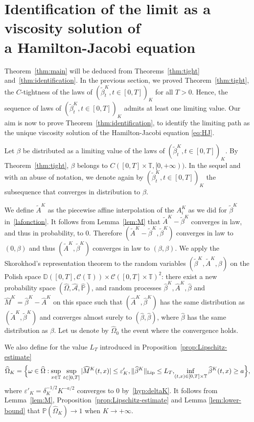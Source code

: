 \documentclass[JEP,XML,SOM,Unicode,published]{cedram}
\let\cal\mathcal
\let\sep:
\theoremstyle{plain}
\theoremstyle{remark}
\newcommand\T{\mathbb{T}}
\renewcommand\P{\mathbb{P}}
\begin{document}
\section{Identification of the limit as a viscosity solution of\\ a Hamilton-Jacobi equation}\label{sec:identif}

Theorem~\ref{thm:main} will be deduced from Theorems~\ref{thm:tight} and~\ref{thm:identification}.
In the previous section, we proved Theorem~\ref{thm:tight}, \ie the $C$-tightness of the laws of $(\widetilde \beta^K_{t}, t\in[0,T])_{K}$ for all $T>0$. Hence, the sequence of laws of $(\widetilde \beta^K_{t}, t\in[0,T])_{K}$ admits at least one limiting value. Our aim is now to prove Theorem~\ref{thm:identification}, \ie to identify the limiting path as the unique viscosity solution of the Hamilton-Jacobi equation \eqref{eq:HJ}.

Let $\beta$ be distributed as a limiting value of the laws of $(\tilde \beta^K_{t}, t\in {[0,T]})_{K}$. By Theorem~\ref{thm:tight}, $\beta$ belongs to $C([0,T]\times\T,[0,+\infty))$. In the sequel and with an abuse of notation, we denote again by $(\tilde \beta^K_{t}, t\in[0,T])_{K}$ the subsequence that converges in distribution to $\beta$.

We define $\widetilde{A}^K$ as the piecewise affine interpolation of the $A^K_i$ as we did for $\widetilde{\beta}^K$ in~\eqref{lafonction}. It follows from Lemma~\ref{lem:M} that
$
\widetilde{A}^K-\widetilde{\beta}^K
$ converges in law, and thus in probability, to $0$. Therefore $(\widetilde{A}^K-\widetilde{\beta}^K,\widetilde{\beta}^K)$ converges in law to $(0, \beta)$ and thus $(\widetilde{A}^K,\widetilde{\beta}^K)$ converges in law to $(\beta, \beta)$.
We apply the Skorokhod's representation theorem to the random variables $(\widetilde{\beta}^K,\widetilde{A}^K,\beta)$ on the Polish space $\mathbb{D}([0,T],{\cal C}(\mathbb{T}))\times{\cal C}([0,T]\times\mathbb{T})^2$: there exist a new probability space $(\widehat{\Omega},\widehat{\mathcal{A}},\widehat{\mathbb{P}})$, and random processes $\widehat{\beta}^K,\widehat{A}^K,\widehat{\beta}$ and $\widehat{M}^K=\widehat{\beta}^K-\widehat{A}^K$ on this space such that $(\widehat{A}^K,\widehat{\beta}^K)$ has the same distribution as $(\widetilde{A}^K,\widetilde{\beta}^K)$ and converges almost surely to $(\widehat{\beta}, \widehat{\beta})$, where $\widehat{\beta}$ has the same distribution as $\beta$. Let us denote by $\widehat{\Omega}_0$ the event where the convergence holds.

We also define for the value $L_T$ introduced in Proposition~\ref{prop:Lipschitz-estimate}
\[
\widehat{\Omega}_K=\Bigl\{\omega\in \widehat{\Omega} \sep \sup_{x\in\T}\,\sup_{t\in[0,T]}|\widehat{M}^K(t,x)|\leq \varepsilon'_K,
\|\widehat{\beta}^K\|_\text{Lip}\leq L_T,\! \inf_{(t,x)\in[0,T]\times\mathbb{T}} \widehat{\beta}^K(t,x)\geq a \Bigr\},
\]
where $\varepsilon'_K=\delta_K^{-1/2} K^{-a/2}$ converges to 0 by~\eqref{hyp:deltaK}.
It follows from Lemma~\ref{lem:M}, Proposition~\ref{prop:Lipschitz-estimate} and Lemma \ref{lem:lower-bound} that $\P(\widehat{\Omega}_K)\to 1$ when $K\to +\infty$.
\end{document}
